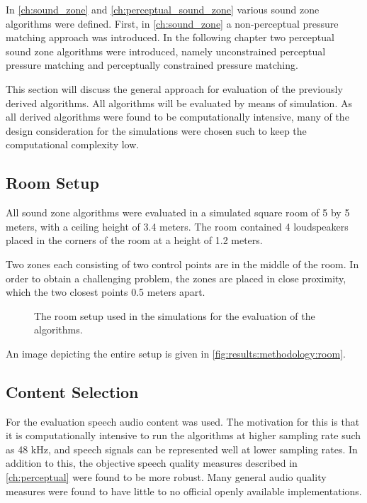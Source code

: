 In \autoref{ch:sound_zone} and \autoref{ch:perceptual_sound_zone} various sound zone algorithms were defined.
First, in \autoref{ch:sound_zone} a non-perceptual pressure matching approach was introduced.
In the following chapter two perceptual sound zone algorithms were introduced, namely 
unconstrained perceptual pressure matching and perceptually constrained pressure matching.

This section will discuss the general approach for evaluation of the previously derived algorithms.
All algorithms will be evaluated by means of simulation. 
As all derived algorithms were found to be computationally intensive, many of the design consideration for the simulations
were chosen such to keep the computational complexity low.

\subsection{Room Setup}
All sound zone algorithms were evaluated in a simulated square room of 5 by 5 meters, with a ceiling height of 3.4 meters.
The room contained 4 loudspeakers placed in the corners of the room at a height of 1.2 meters.

Two zones each consisting of two control points are in the middle of the room.
In order to obtain a challenging problem, the zones are placed in close proximity, which the two closest points 0.5 meters apart.

\begin{figure}[]
    \centering
    \scalebox{1.0}{}
    \caption{The room setup used in the simulations for the evaluation of the algorithms.}
    \label{fig:results:methodology:room}
\end{figure}
An image depicting the entire setup is given in \autoref{fig:results:methodology:room}.

\subsection{Content Selection}
For the evaluation speech audio content was used.
The motivation for this is that it is computationally intensive to run the algorithms at higher sampling rate such as 48 kHz, and speech signals 
can be represented well at lower sampling rates.
In addition to this, the objective speech quality measures described in \autoref{ch:perceptual} were found to be more robust.
Many general audio quality measures were found to have little to no official openly available implementations.


